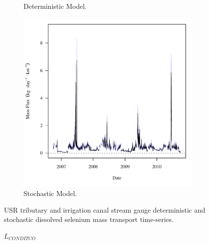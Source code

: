 \begin{linenumbers}
\begin{landscape}
\begin{figure}
\begin{subfigure}{0.7\textwidth}
			\caption{Deterministic Model.}
		\end{subfigure}%
		\begin{subfigure}{0.7\textwidth}
			\centering
			\includegraphics[width=\tableCustomSize]{"Figures/Results_USR/Stochastic/f CAN"}
			\caption{Stochastic Model.}
		\end{subfigure}
		\caption{USR tributary and irrigation canal stream gauge deterministic and stochastic dissolved selenium mass transport time-series.}
	\end{figure}
\end{landscape}
\subfiguremid
\begin{landscape}
	\begin{figure}
		$ \displaystyle L_{CONDITCO} $
		\begin{subfigure}{0.7\textwidth}
			\centering

\end{subfigure}
\end{figure}
\end{landscape}
\end{linenumbers}
